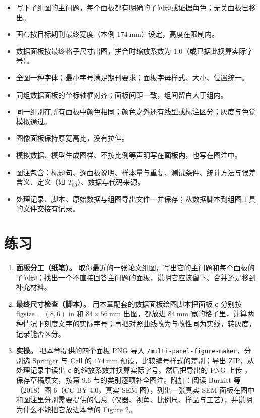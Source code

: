 \begin{itemize}
\item 写下了组图的主问题，每个面板都有明确的子问题或证据角色；无关面板已移出。
\item 画布按目标期刊最终宽度（本例 $174\ \text{mm}$）设定，高度在限制内。
\item 数据面板按最终格子尺寸出图，拼合时缩放系数为 $1.0$（或已据此换算实际字号）。
\item 全图一种字体；最小字号满足期刊要求；面板字母样式、大小、位置统一。
\item 同组数据面板的坐标轴框对齐；面板间距一致，组间留白大于组内。
\item 同一组别在所有面板中颜色相同；颜色之外还有线型或标注区分；灰度与色觉模拟通过。
\item 图像面板保持原宽高比，没有拉伸。
\item 模拟数据、模型生成图样、不按比例等声明写在\textbf{面板内}，也写在图注中。
\item 图注包含：标题句、逐面板说明、样本量与重复、测试条件、统计方法与误差含义、定义（如 $T_{80}$）、数据与代码来源。
\item 处理记录、脚本、原始数据与组图导出文件一并保存；从数据脚本到组图工具的文件交接有记录。
\end{itemize}

\section{练习}

\begin{enumerate}
\item \textbf{面板分工（纸笔）。} 取你最近的一张论文组图，写出它的主问题和每个面板的子问题；找出一个不直接回答主问题的面板，说明它应该留下、合并还是移到补充材料。
\item \textbf{最终尺寸检查（脚本）。} 用本章配套的数据面板绘图脚本把面板 \textbf{c} 分别按 $\text{figsize}=(8,6)\ \text{in}$ 和 $84 \times 56\ \text{mm}$ 出图，都放进 $84\ \text{mm}$ 宽的格子里，计算两种情况下刻度文字的实际字号；再把对照曲线改为与改性同为实线，转灰度，记录能否区分。
\item \textbf{\scidraw{} 实操。} 把本章提供的四个面板 PNG 导入 \texttt{/multi-panel-\allowbreak figure-\allowbreak maker}，分别选 Springer 与 Cell 的 $174\ \text{mm}$ 预设，比较编号样式的差别；导出 ZIP，从处理记录中读出 \textbf{c} 的缩放系数并换算实际字号。然后把导出的 PNG 上传 ，保存草稿原文，按第 9.6 节的类别逐项补全图注。附加：阅读 Burkitt 等（2018）图 6（CC BY 4.0，真实 SEM 图），列出一张真实 SEM 面板在图中和图注里分别需要提供的信息（仪器、视角、比例尺、样品与工艺），并说明为什么不能把它放进本章的 Figure 2。
\end{enumerate}

